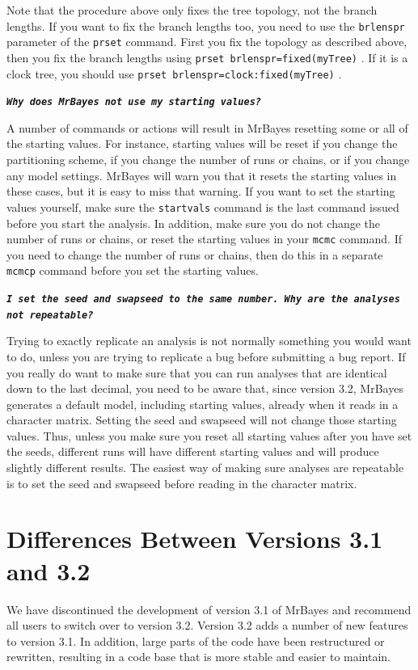 \documentclass[12pt]{book}
\newcommand{\ttt}[1]{\texttt{#1} }
\newcommand{\tb}[1]{\ttt{\textbf{#1}} }
\begin{document}
Note that the procedure above only fixes the tree topology, not the branch lengths. If you want to
fix the branch lengths too, you need to use the \ttt{brlenspr} parameter of the \ttt{prset}
command.  First you fix the topology as described above, then you fix the branch lengths using
\ttt{prset brlenspr=fixed(myTree)}. If it is a clock tree, you should use \ttt{prset
brlenspr=clock:fixed(myTree)}.

\tb{\it{Why does MrBayes not use my starting values?}}

A number of commands or actions will result in MrBayes resetting some or all of the starting
values. For instance, starting values will be reset if you change the partitioning scheme, if you
change the number of runs or chains, or if you change any model settings. MrBayes will warn you
that it resets the starting values in these cases, but it is easy to miss that warning. If you want
to set the starting values yourself, make sure the \ttt{startvals} command is the last command
issued before you start the analysis. In addition, make sure you do not change the number of runs
or chains, or reset the starting values in your \ttt{mcmc} command. If you need to change the
number of runs or chains, then do this in a separate \ttt{mcmcp} command before you set the
starting values.

\tb{\it{I set the seed and swapseed to the same number. Why are the analyses not repeatable?}}

Trying to exactly replicate an analysis is not normally something you would want to do, unless you
are trying to replicate a bug before submitting a bug report. If you really do want to make sure
that you can run analyses that are identical down to the last decimal, you need to be aware that,
since version 3.2, MrBayes generates a default model, including starting values, already when it
reads in a character matrix. Setting the seed and swapseed will not change those starting values.
Thus, unless you make sure you reset all starting values after you have set the seeds, different
runs will have different starting values and will produce slightly different results. The easiest
way of making sure analyses are repeatable is to set the seed and swapseed before reading in the
character matrix.

\section{Differences Between Versions 3.1 and 3.2}

We have discontinued the development of version 3.1 of MrBayes and recommend all users to switch
over to version 3.2. Version 3.2 adds a number of new features to version 3.1. In addition, large
parts of the code have been restructured or rewritten, resulting in a code base that is more stable
and easier to maintain.
\end{document}
